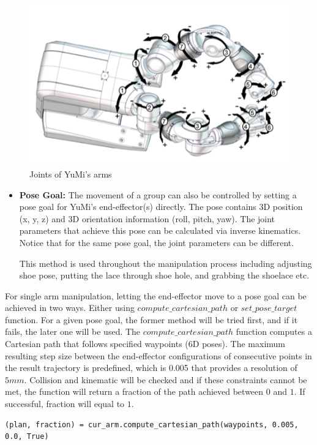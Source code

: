 \begin{figure}[H]
\centering
\includegraphics[width = 0.7\columnwidth]{Implementation/mp/yumijoints.png}
\caption{Joints of YuMi's arms \citep{ABBsDual5:online}}
\label{yumijoint}
\end{figure}

\begin{itemize}
    \item \textbf{Pose Goal:} The movement of a group can also be controlled by setting a pose goal for YuMi's end-effector(s) directly. The pose contains 3D position (x, y, z) and 3D orientation information (roll, pitch, yaw). The joint parameters that achieve this pose can be calculated via inverse kinematics. Notice that for the same pose goal, the joint parameters can be different.
    
    This method is used throughout the manipulation process including adjusting shoe pose, putting the lace through shoe hole, and grabbing the shoelace etc.
\end{itemize}

For single arm manipulation, letting the end-effector move to a pose goal can be achieved in two ways. Either using $compute\_cartesian\_path$ or $set\_pose\_target$ function. For a given pose goal, the former method will be tried first, and if it fails, the later one will be used. The $compute\_cartesian\_path$ function computes a Cartesian path that follows specified waypoints (6D poses). The maximum resulting step size between the end-effector configurations of consecutive points in the result trajectory is predefined, which is 0.005 that provides a resolution of $5mm$. Collision and kinematic will be checked and if these constraints cannot be met, the function will return a fraction of the path achieved between $0$ and $1$. If successful, fraction will equal to $1$.

\begin{verbatim}
(plan, fraction) = cur_arm.compute_cartesian_path(waypoints, 0.005, 0.0, True)
\end{verbatim}

